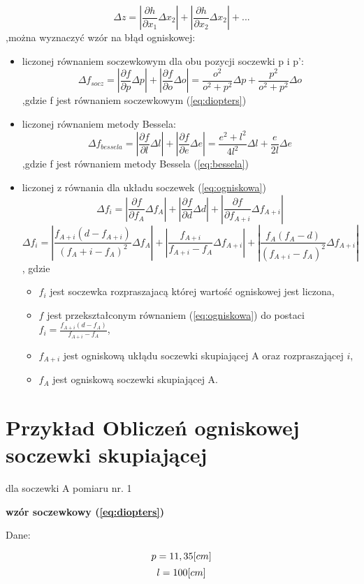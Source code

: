 \documentclass{article}
\begin{document}
\[ \Delta z = |\frac{\partial h}{\partial x_1} \Delta x_2| + |\frac{\partial h}{\partial x_2} \Delta x_2| + ...\]
,można wyznaczyć wzór na błąd ogniskowej:
\begin{itemize}
    \item liczonej równaniem soczewkowym dla obu pozycji soczewki p i p':
\[ \Delta f_{socz} = |\frac{\partial f}{\partial p} \Delta p| + |\frac{\partial f}{\partial o} \Delta o| = \frac{o^2}{o^2+p^2}\Delta p + \frac{p^2}{o^2+p^2}\Delta o \]
,gdzie f jest równaniem soczewkowym (\ref{eq:diopters})

\item liczonej równaniem metody Bessela: \[ \Delta f_{bessela} = |\frac{\partial f}{\partial l} \Delta l| + |\frac{\partial f}{\partial e} \Delta e| = \frac{e^2 + l^2}{4l^2} \Delta l + \frac{e}{2l}\Delta e\] 
,gdzie f jest równaniem metody Bessela (\ref{eq:bessela})

\item liczonej z równania dla układu soczewek (\ref{eq:ogniskowa}) \[ \Delta f_i = |\frac{\partial f}{\partial f_A} \Delta f_A| + |\frac{\partial f}{\partial d} \Delta d| + |\frac{\partial f}{\partial f_{A+i}} \Delta f_{A+i}|\]
\[ \Delta f_i = |\frac{f_{A+i}(d-f_{A+i})}{(f_A+i - f_A)^2} \Delta f_A| + |\frac{f_{A+i}}{f_{A+i} -f_A} \Delta f_{A+i} | + |\frac{f_A (f_A -d)}{(f_{A+i} - f_A)^2} \Delta f_{A+i}|\]
, gdzie 
\begin{itemize}
    \item $f_i$ jest soczewka rozpraszajacą której wartość ogniskowej jest liczona,
    \item  $f$ jest przekształconym równaniem (\ref{eq:ogniskowa}) do postaci $f_{i} = \frac{f_{A+i}(d-f_A)}{f_{A+i} - f_A}$,
    \item $f_{A+i}$ jest ogniskową ukłądu soczewki skupiającej A oraz rozpraszającej $i$,
    \item  $f_A$ jest ogniskową soczewki skupiającej A.
\end{itemize} 
\end{itemize}

\section*{Przykład Obliczeń ogniskowej soczewki skupiającej}

dla soczewki A pomiaru nr. 1

\textbf{wzór soczewkowy (\ref{eq:diopters})}

Dane: 

\begin{equation}
    p = 11,35[cm]\nonumber\\
\end{equation}
\begin{equation}
    l = 100[cm] \nonumber\\
\end{equation}
\end{document}
